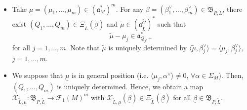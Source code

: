 \documentclass[12pt]{amsart}
\theoremstyle{definition}
\theoremstyle{plain}
\theoremstyle{remark}
\newcommand{\fa}{\mathfrak{a}}
\newcommand{\fB}{\mathfrak{B}}
\newcommand{\cF}{\mathcal{F}}
\newcommand{\cX}{\mathcal{X}}
\numberwithin{equation}{section}
\newcommand{\tG}{\widetilde{G}}
\newcommand{\tL}{\widetilde{L}}
\begin{document}
\begin{itemize}
\begin{align*}
M_{P_1\mid P}(\lambda)^{-1}
\delta_{P_1\mid P_1'}(\lambda)
M_{P_1'\mid P_2}(\lambda) \cdots \\
& \cdots\;
\delta_{P_{m-1}\mid P_{m-1}'}(\lambda)
M_{P_{m-1}'\mid P_m}(\lambda)
\delta_{P_m\mid P_m'}(\lambda)
M_{P_m'\mid P}(\lambda).
\end{align*}
\item Take $\underline{\mu}=(\mu_1,\ldots,\mu_m)\in (\fa_M^*)^m$.
For any $\underline{\beta}=(\beta_1^\vee,\ldots,\beta_m^\vee)\in \fB_{P,\tL}$,
there exist $(Q_1,\ldots,Q_m)\in \Xi_{\tL}(\underline{\beta})$ and $\tilde{\mu}\in (\fa_{\tL}^{\tG})^*$ such that
\[
\tilde{\mu}-\mu_j\in \fa_{Q_j,+}^*
\]
for all $j=1,\ldots,m$. 
Note that $\tilde{\mu}$ is uniquely determined by $\langle \tilde{\mu},\beta_j^\vee\rangle=\langle \mu_j,\beta_j^\vee\rangle$, $j=1,\dots,m$.
\item We suppose that $\underline{\mu}$ is in general position (i.e. $\langle \mu_j,\alpha^\vee\rangle\neq 0$, $\forall \alpha\in \Sigma_M$). Then, $(Q_1,\dots,Q_m)$ is uniquely determined. 
Hence, we obtain a map $\cX_{\tL,\underline{\mu}}\colon \fB_{P,\tL}\to \cF_1(M)^m$
with $\cX_{\tL,\underline{\mu}}(\underline{\beta})\in \Xi_{\tL}(\underline{\beta})$ for all $\underline{\beta}\in \fB_{P,\tL}$. 
\end{itemize}
\end{document}
